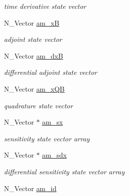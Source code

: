 \begin{DoxyCompactItemize}
\begin{DoxyCompactList}\small\item\em time derivative state vector \end{DoxyCompactList}\item 
\hypertarget{struct_temp_data_a318f0b9b1f4b33326184a350912c6fb1}{}N\+\_\+\+Vector \hyperlink{struct_temp_data_a318f0b9b1f4b33326184a350912c6fb1}{am\+\_\+x\+B}\label{struct_temp_data_a318f0b9b1f4b33326184a350912c6fb1}

\begin{DoxyCompactList}\small\item\em adjoint state vector \end{DoxyCompactList}\item 
\hypertarget{struct_temp_data_a6dc87d123304fe3c6a20899fca777501}{}N\+\_\+\+Vector \hyperlink{struct_temp_data_a6dc87d123304fe3c6a20899fca777501}{am\+\_\+dx\+B}\label{struct_temp_data_a6dc87d123304fe3c6a20899fca777501}

\begin{DoxyCompactList}\small\item\em differential adjoint state vector \end{DoxyCompactList}\item 
\hypertarget{struct_temp_data_ac4099b4f6bf1f15d7d07b88993515da7}{}N\+\_\+\+Vector \hyperlink{struct_temp_data_ac4099b4f6bf1f15d7d07b88993515da7}{am\+\_\+x\+Q\+B}\label{struct_temp_data_ac4099b4f6bf1f15d7d07b88993515da7}

\begin{DoxyCompactList}\small\item\em quadrature state vector \end{DoxyCompactList}\item 
\hypertarget{struct_temp_data_a5253085927038bdeb7c327aa14470722}{}N\+\_\+\+Vector $\ast$ \hyperlink{struct_temp_data_a5253085927038bdeb7c327aa14470722}{am\+\_\+sx}\label{struct_temp_data_a5253085927038bdeb7c327aa14470722}

\begin{DoxyCompactList}\small\item\em sensitivity state vector array \end{DoxyCompactList}\item 
\hypertarget{struct_temp_data_a2457438c1ae3ea571031bc3c2e440da2}{}N\+\_\+\+Vector $\ast$ \hyperlink{struct_temp_data_a2457438c1ae3ea571031bc3c2e440da2}{am\+\_\+sdx}\label{struct_temp_data_a2457438c1ae3ea571031bc3c2e440da2}

\begin{DoxyCompactList}\small\item\em differential sensitivity state vector array \end{DoxyCompactList}\item 
\hypertarget{struct_temp_data_ad918917fdce710fbd6fe9774e35bfcfb}{}N\+\_\+\+Vector \hyperlink{struct_temp_data_ad918917fdce710fbd6fe9774e35bfcfb}{am\+\_\+id}\label{struct_temp_data_ad918917fdce710fbd6fe9774e35bfcfb}


\end{DoxyCompactItemize}
